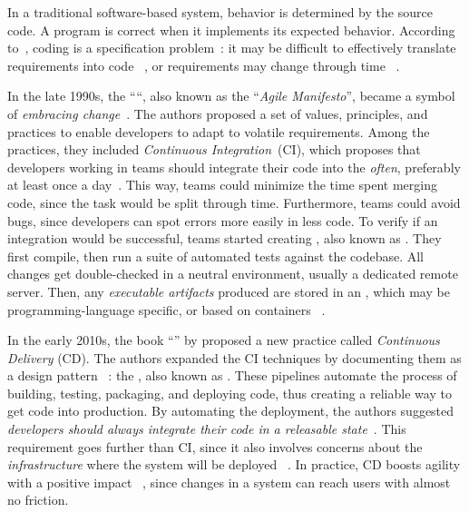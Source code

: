   In a traditional software-based system, behavior is determined by the
  source code. A program is correct when it implements its expected behavior.
  According to~\parencite{MartinCleanCode2008}, coding is a specification
  problem~\parencite{MartinCleanArchitecture2017,MartinCleanCode2008}:
    it may be difficult to effectively translate requirements into code%
    ~\parencite{Fowler2018Refactoring:Code},
    or requirements may change through time%
    ~\parencite{Beck2001ManifestoDevelopment,Beck1999ExtremeChange}.

  In the late 1990s, the ````,
  also known as the ``\emph{Agile Manifesto}'', became a symbol of
  \emph{embracing change}~\parencite{Beck2001ManifestoDevelopment}.
  The authors proposed a set of values, principles, and practices
  to enable developers to adapt to volatile requirements.
  Among the practices, they included \emph{Continuous Integration}~(CI),
  which proposes that developers working in teams should integrate their
  code into the  \emph{often},
  preferably at least once a day~\parencite{Beck1999ExtremeChange}.
  This way, teams could minimize the time spent merging code,
  since the task would be split through time. Furthermore, teams
  could avoid bugs, since developers can spot errors more easily
  in less code. To verify if an integration would be successful,
  teams started creating ,
  also known as \mbox{}. They first compile,
  then run a suite of automated tests against the codebase. All changes
  get double-checked in a neutral environment, usually a dedicated
  remote server. Then, any \emph{executable artifacts} produced are
  stored in an , which may
  be programming-language specific, or based on containers%
  ~\parencite{Kim2021TheOrganizations,Morris2020InfrastructureCode}.

  In the early 2010s, the book ``''
  by \citeauthor{Humble2010ContinuousAutomation} proposed a
  new practice called \emph{Continuous Delivery} (CD). The authors
  expanded the CI techniques by documenting them as a design pattern%
  ~\parencite{Johnson1998ThePattern}: the ,
  also known as . These pipelines automate
  the process of building, testing, packaging, and deploying code, thus creating
  a reliable way to get code into production. By automating the deployment,
  the authors suggested \emph{developers should always integrate their
  code in a releasable state}~\parencite{Humble2010ContinuousAutomation}.
  This requirement goes further than CI, since it also involves
  concerns about the \emph{infrastructure} where the system will be deployed%
  ~\parencite{Kim2021TheOrganizations,Morris2020InfrastructureCode}.
  In practice, CD boosts agility with a positive impact%
  ~\parencite{Forsgren2018Accelerate:Organizations}, since changes
  in a system can reach users with almost no friction.

